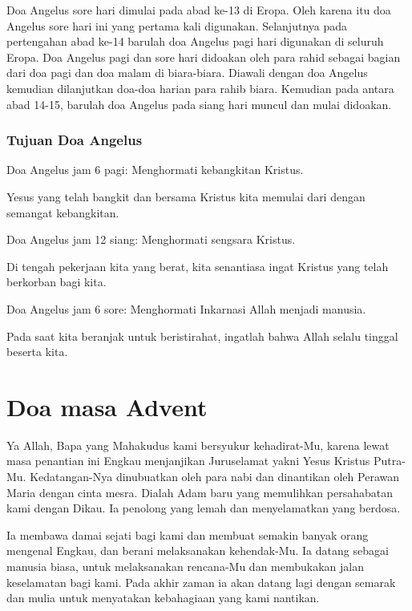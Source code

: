 \documentclass{article}
\begin{document}
Doa Angelus sore hari dimulai pada abad ke-13 di Eropa. Oleh karena itu
doa Angelus sore hari ini yang pertama kali digunakan. Selanjutnya pada
pertengahan abad ke-14 barulah doa Angelus pagi hari digunakan di
seluruh Eropa. Doa Angelus pagi dan sore hari didoakan oleh para rahid
sebagai bagian dari doa pagi dan doa malam di biara-biara. Diawali
dengan doa Angelus kemudian dilanjutkan doa-doa harian para rahib
biara. Kemudian pada antara abad 14-15, barulah doa Angelus pada siang
hari muncul dan mulai didoakan.

\subsubsection[Tujuan Doa Angelus]{Tujuan Doa Angelus}
\begin{description}
\item[Doa Angelus jam 6 pagi: Menghormati kebangkitan Kristus.]

\end{description}
Yesus yang telah bangkit dan bersama Kristus kita memulai dari dengan
semangat kebangkitan.

Doa Angelus jam 12 siang: Menghormati sengsara Kristus.

Di tengah pekerjaan kita yang berat, kita senantiasa ingat Kristus yang
telah berkorban bagi kita.

Doa Angelus jam 6 sore: Menghormati Inkarnasi Allah menjadi manusia.

Pada saat kita beranjak untuk beristirahat, ingatlah bahwa Allah selalu
tinggal beserta kita.

\section[Doa masa Advent]{Doa masa Advent}
Ya Allah, Bapa yang Mahakudus kami bersyukur kehadirat-Mu, karena lewat
masa penantian ini Engkau menjanjikan Juruselamat yakni Yesus Kristus
Putra-Mu. Kedatangan-Nya dinubuatkan oleh para nabi dan dinantikan oleh
Perawan Maria dengan cinta mesra. Dialah Adam baru yang memulihkan
persahabatan kami dengan Dikau. Ia penolong yang lemah dan
menyelamatkan yang berdosa.

Ia membawa damai sejati bagi kami dan membuat semakin banyak orang
mengenal Engkau, dan berani melaksanakan kehendak-Mu. Ia datang sebagai
manusia biasa, untuk melaksanakan rencana-Mu dan membukakan jalan
keselamatan bagi kami. Pada akhir zaman ia akan datang lagi dengan
semarak dan mulia untuk menyatakan kebahagiaan yang kami nantikan.
\end{document}

